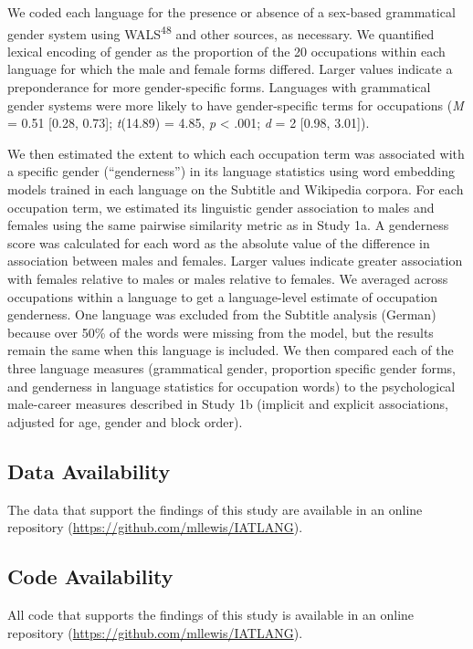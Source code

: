 \documentclass[11pt]{wlscirep}
\begin{document}
We coded each language for the presence or absence of a sex-based grammatical gender system using WALS\textsuperscript{48} and other sources, as necessary. We quantified lexical encoding of gender as the proportion of the 20 occupations within each language for which the male and female forms differed. Larger values indicate a preponderance for more gender-specific forms.  Languages with grammatical gender systems were more likely to have gender-specific terms for occupations
(\emph{M} = 0.51 {[}0.28, 0.73{]}; \emph{t}(14.89) = 4.85, \emph{p} \textless{} .001; \emph{d} = 2 {[}0.98, 3.01{]}).

We then estimated the extent to which each occupation term was associated with a specific gender (``genderness'')  in its language statistics using word
embedding models trained in each language on the Subtitle and Wikipedia
corpora. For each occupation term, we estimated its linguistic gender association to males and females using the same pairwise similarity metric as in Study 1a. A genderness score was calculated for each word as the absolute value of the difference in association between males and females.  Larger values indicate greater association with females relative to males or males relative to females. We averaged across occupations within a language to get a
language-level estimate of occupation genderness. One language was excluded from the Subtitle analysis (German) because over 50\% of the words were missing from the model, but the results remain the same when this language is included.  We then compared each of the three
language measures (grammatical gender, proportion specific gender forms,
and genderness in language statistics for occupation words) to the
psychological male-career measures described in Study 1b (implicit and
explicit associations, adjusted for age, gender and block order).


\subsection*{Data Availability}

The data that support the findings of this study are available in an online repository (\url{https://github.com/mllewis/IATLANG}).

\subsection*{Code Availability}
All code that supports the findings of this study is available in an online repository (\url{https://github.com/mllewis/IATLANG}).
\end{document}
